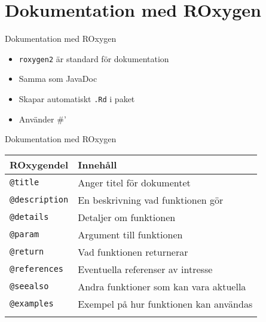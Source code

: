 \documentclass[
  11pt,
  ignorenonframetext,
]{beamer}
\providecommand{\tightlist}{%
  \setlength{\itemsep}{0pt}\setlength{\parskip}{0pt}}
\begin{document}
\section{Dokumentation med ROxygen}\label{dokumentation-med-roxygen}

\begin{frame}{Dokumentation med ROxygen}
\label{dokumentation-med-roxygen-1}
\begin{itemize}
\tightlist
\item
  \texttt{roxygen2} är standard för dokumentation
\item
  Samma som JavaDoc
\item
  Skapar automatiskt \texttt{.Rd} i paket
\item
  Använder \#'
\end{itemize}
\end{frame}

\begin{frame}[fragile]{Dokumentation med ROxygen}
\label{dokumentation-med-roxygen-2}
\begin{longtable}[]{@{}ll@{}}
\toprule\noalign{}
ROxygendel & Innehåll \\
\midrule\noalign{}
\endhead
\texttt{@title} & Anger titel för dokumentet \\
\texttt{@description} & En beskrivning vad funktionen gör \\
\texttt{@details} & Detaljer om funktionen \\
\texttt{@param} & Argument till funktionen \\
\texttt{@return} & Vad funktionen returnerar \\
\texttt{@references} & Eventuella referenser av intresse \\
\texttt{@seealso} & Andra funktioner som kan vara aktuella \\
\texttt{@examples} & Exempel på hur funktionen kan användas \\
\bottomrule\noalign{}
\end{longtable}
\end{frame}
\end{document}
